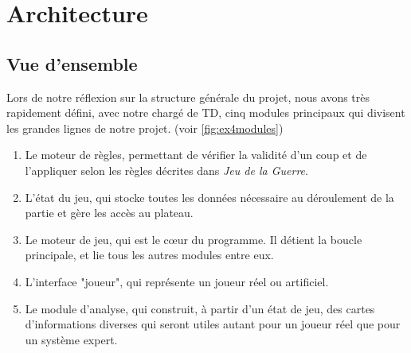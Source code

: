 \documentclass[a4paper]{report}
\begin{document}
\chapter{Architecture}

\section{Vue d'ensemble}

Lors de notre réflexion sur la structure générale du projet, nous avons très rapidement défini, avec notre chargé de TD, cinq modules principaux qui divisent les grandes lignes de notre projet. (voir \ref{fig:ex4modules})

\begin{enumerate}
\item Le moteur de règles, permettant de vérifier la validité d'un coup et de l'appliquer selon les règles décrites dans \textit{Jeu de la Guerre}.
\item L'état du jeu, qui stocke toutes les données nécessaire au déroulement de la partie et gère les accès au plateau.
\item Le moteur de jeu, qui est le cœur du programme. Il détient la boucle principale, et lie tous les autres modules entre eux. 
\item L'interface "joueur", qui représente un joueur réel ou artificiel.
\item Le module d'analyse, qui construit, à partir d'un état de jeu, des cartes d'informations diverses qui seront utiles autant pour un joueur réel que pour un système expert.

\end{enumerate}


\end{document}
